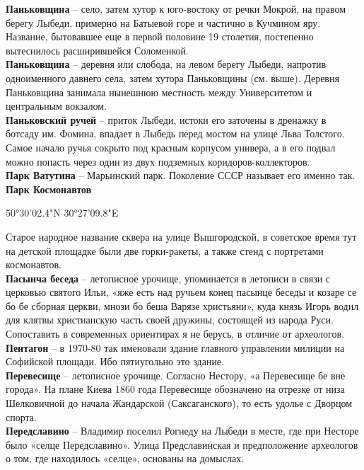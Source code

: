 \textbf{Паньковщина} – село, затем хутор к юго-востоку от речки Мокрой, на правом берегу Лыбеди, примерно на Батыевой горе и частично в Кучмином яру. Название, бытовавшее еще в первой половине 19 столетия, постепенно вытеснилось расширившейся Соломенкой.\\

\textbf{Паньковщина} – деревня или слобода, на левом берегу Лыбеди, напротив одноименного давнего села, затем хутора Паньковщины (см. выше). Деревня Паньковщина занимала нынешнюю местность между Университетом и центральным вокзалом.\\

\textbf{Паньковский ручей} – приток Лыбеди, истоки его заточены в дренажку в ботсаду им. Фомина, впадает в Лыбедь перед мостом на улице Льва Толстого. Самое начало ручья сокрыто под красным корпусом универа, а в его подвал можно попасть через один из двух подземных коридоров-коллекторов.\\

\textbf{Парк Ватутина} – Марьинский парк. Поколение СССР называет его именно так.\\

\textbf{Парк Космонавтов}

50°30'02.4"N 30°27'09.8"E

Старое народное название сквера на улице Вышгородской, в советское время тут на детской площадке были две горки-ракеты, а также стенд с портретами космонавтов.\\

\textbf{Пасынча беседа} – летописное урочище, уп\-оминается в летописи в связи с церковью святого Ильи, «яже есть над ручьем конец пасынце беседы и козаре се бо бе сборная церкви, мнози бо беша Варязе христьяни», куда князь Игорь водил для клятвы христианскую часть своей дружины, состоящей из народа Руси. Сопоставить в современных ориентирах я не берусь, в отличие от археологов.\\

\textbf{Пентагон} – в 1970-80 так именовали здание главного управлении милиции на Софийской площади. Ибо пятиугольно это здание.\\

\textbf{Перевесище} – летописное урочище. Согласно Нестору, «а Перевесище бе вне города». На плане Киева 1860 года Перевесище обозначено на отрезке от низа Шелковичной до начала Жандарской (Саксаганского), то есть удолье с Дворцом спорта.\\

\textbf{Передславино} – Владимир поселил Рогнеду на Лыбеди в месте, где при Несторе было «селце Передславино». Улица Предславинская и предположение археологов о том, где находилось «селце», основаны на домыслах.\\

